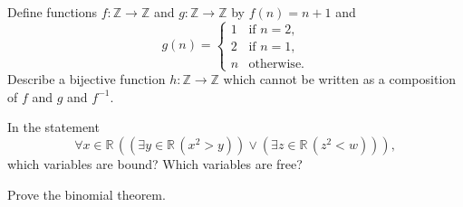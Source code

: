 \documentclass[12pt]{midterm}
\begin{document}
\begin{exam}
\begin{solution}\begin{solutiontext}
\end{solutiontext}\end{solution}

\begin{problem}[350]
Define functions $f : \mathbb{Z} \to \mathbb{Z}$ and $g : \mathbb{Z}
\to \mathbb{Z}$ by $f(n) = n+1$ and
$$
g(n) = \begin{cases} 1 & \mbox{if $n = 2$}, \\
2 & \mbox{if $n = 1$}, \\
n & \mbox{otherwise.}
\end{cases}
$$
Describe a bijective function $h : \mathbb{Z} \to \mathbb{Z}$ which
cannot be written as a composition of $f$ and $g$ and $f^{-1}$.
\end{problem}

\begin{solution}\begin{solutiontext}
\end{solutiontext}\end{solution}

\begin{problem}[350]
In the statement
$$
\forall x \in \mathbb{R}\, \left( 
\left( \exists y \in \mathbb{R}\, (x^2 > y) \right) \vee
\left( \exists z \in \mathbb{R}\, (z^2 < w) \right) \right),
$$
which variables are bound?  Which variables are free?
\end{problem}

\begin{solution}\begin{solutiontext}
\end{solutiontext}\end{solution}

\begin{problem}[350]
Prove the binomial theorem.
\end{problem}

\begin{solution}\begin{solutiontext}
\end{solutiontext}\end{solution}


\end{exam}
\end{document}
